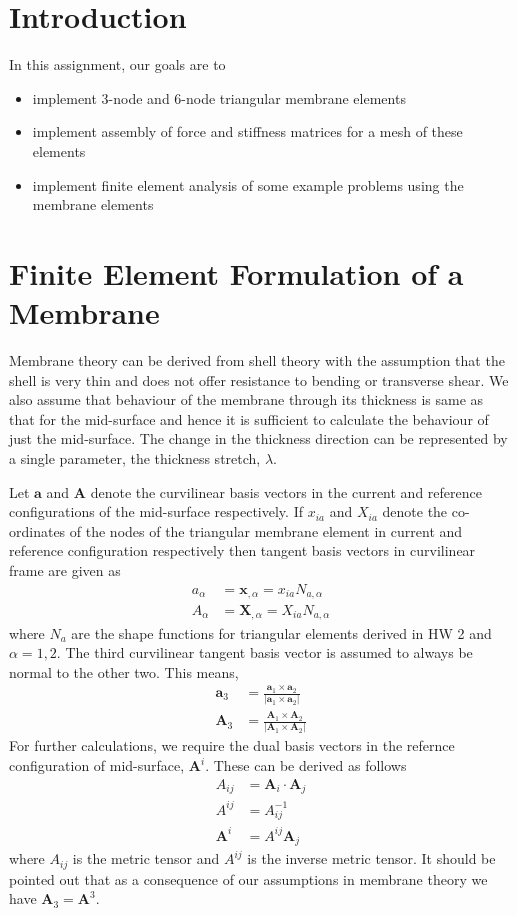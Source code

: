 \documentclass[../main.tex]{subfiles}
\begin{document}
\lstset{language=Matlab}
\section*{Introduction}
In this assignment, our goals are to
\begin{itemize}
\item implement 3-node and 6-node triangular membrane elements
\item implement assembly of force and stiffness matrices for a mesh of
  these elements
\item implement finite element analysis of some example problems using
  the membrane elements
\end{itemize}
\section{Finite Element Formulation of a Membrane}
Membrane theory can be derived from shell theory with the assumption
that the shell is very thin and does not offer resistance to bending
or transverse shear. We also assume that behaviour of the membrane
through its thickness is same as that for the mid-surface and hence it
is sufficient to calculate the behaviour of just the mid-surface. The
change in the thickness direction can be represented by a single
parameter, the thickness stretch, $\lambda$.

Let $\mathbf{a}$ and $\mathbf{A}$ denote the curvilinear basis vectors
in the current and reference configurations of the mid-surface
respectively. If $x_{ia}$ and $X_{ia}$ denote the co-ordinates of the
nodes of the triangular membrane element in current and reference
configuration respectively then tangent basis vectors in curvilinear
frame are given as
\begin{align*}
  a_\alpha &= \mathbf{x}_{,\alpha}=x_{ia}N_{a,\alpha} \\
  A_\alpha &= \mathbf{X}_{,\alpha}=X_{ia}N_{a,\alpha}
\end{align*}
where $N_{a}$ are the shape functions for triangular elements derived
in HW 2 and $\alpha = 1,2$. The third curvilinear tangent basis vector
is assumed to always be normal to the other two. This means,
\begin{align*}
  \mathbf{a}_3 &= \frac{\mathbf{a}_1\times \mathbf{a}_2}{\lvert \mathbf{a}_1\times \mathbf{a}_2\rvert}\\
  \mathbf{A}_3 &= \frac{\mathbf{A}_1\times \mathbf{A}_2}{\lvert \mathbf{A}_1\times \mathbf{A}_2\rvert}
\end{align*}
For further calculations, we require the dual basis vectors in the
refernce configuration of mid-surface, $\mathbf{A}^i$. These can be
derived as follows
\begin{align*}
  A_{ij} &= \mathbf{A}_i\cdot \mathbf{A}_j \\
  A^{ij} &= A_{ij}^{-1}\\
  \mathbf{A}^i &= A^{ij}\mathbf{A}_j
\end{align*}
where $A_{ij}$ is the metric tensor and $A^{ij}$ is the inverse metric
tensor. It should be pointed out that as a consequence of our
assumptions in membrane theory we have $\mathbf{A}_3 = \mathbf{A}^3$.
\end{document}
